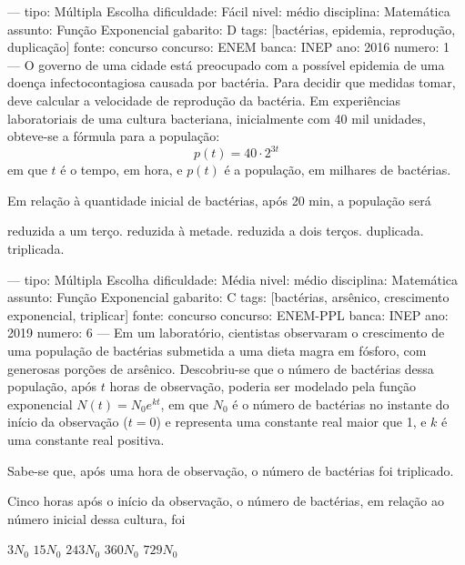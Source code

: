 
---
tipo: Múltipla Escolha
dificuldade: Fácil
nivel: médio
disciplina: Matemática
assunto: Função Exponencial
gabarito: D
tags: [bactérias, epidemia, reprodução, duplicação]
fonte: concurso
concurso: ENEM
banca: INEP
ano: 2016
numero: 1
---
\question
O governo de uma cidade está preocupado com a possível epidemia de uma doença infectocontagiosa causada por bactéria. Para decidir que medidas tomar, deve calcular a velocidade de reprodução da bactéria. Em experiências laboratoriais de uma cultura bacteriana, inicialmente com 40 mil unidades, obteve-se a fórmula para a população:
\[ p(t) = 40 \cdot 2^{3t} \]
em que \( t \) é o tempo, em hora, e \( p(t) \) é a população, em milhares de bactérias.

Em relação à quantidade inicial de bactérias, após 20 min, a população será
\begin{choices}
\choice reduzida a um terço.
\choice reduzida à metade.
\choice reduzida a dois terços.
\correctchoice duplicada.
\choice triplicada.
\end{choices}


---
tipo: Múltipla Escolha
dificuldade: Média
nivel: médio
disciplina: Matemática
assunto: Função Exponencial
gabarito: C
tags: [bactérias, arsênico, crescimento exponencial, triplicar]
fonte: concurso
concurso: ENEM-PPL
banca: INEP
ano: 2019
numero: 6
---
\question
Em um laboratório, cientistas observaram o crescimento de uma população de bactérias submetida a uma dieta magra em fósforo, com generosas porções de arsênico. Descobriu-se que o número de bactérias dessa população, após \( t \) horas de observação, poderia ser modelado pela função exponencial \( N(t) = N_0 e^{kt} \), em que \( N_0 \) é o número de bactérias no instante do início da observação (\( t = 0 \)) e representa uma constante real maior que 1, e \( k \) é uma constante real positiva.

Sabe-se que, após uma hora de observação, o número de bactérias foi triplicado.

Cinco horas após o início da observação, o número de bactérias, em relação ao número inicial dessa cultura, foi
\begin{oneparchoices}
\choice \( 3N_0 \)
\choice \( 15N_0 \)
\correctchoice \( 243N_0 \)
\choice \( 360N_0 \)
\choice \( 729N_0 \)
\end{oneparchoices}

